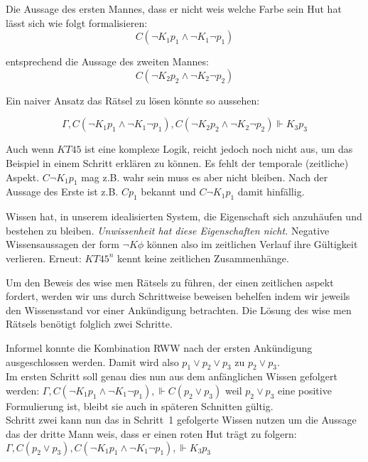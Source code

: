 Die Aussage des ersten Mannes, dass er nicht weis welche Farbe sein Hut hat lässt sich wie folgt formalisieren:
\begin{equation*}
	C(\neg K_1 p_1 \wedge \neg K_1 \neg p_1)
\end{equation*}

entsprechend die Aussage des zweiten Mannes:
\begin{equation*}
	C(\neg K_2 p_2 \wedge \neg K_2 \neg p_2)
\end{equation*}

Ein naiver Ansatz das Rätsel zu lösen könnte so aussehen:

\begin{equation}
	\Gamma, C(\neg K_1 p_1 \wedge \neg K_1 \neg p_1), C(\neg K_2 p_2 \wedge \neg K_2 \neg p_2) \Vdash K_3 p_3
\end{equation}

Auch wenn $KT45$ ist eine komplexe Logik, reicht jedoch noch nicht aus, um das Beispiel in einem Schritt erklären zu können.
Es fehlt der temporale (zeitliche) Aspekt.
$C \neg K_1 p_1$ mag z.B. wahr sein muss es aber nicht bleiben.
Nach der Aussage des Erste ist z.B. $C p_1$ bekannt und $C \neg K_1 p_1$ damit hinfällig.

Wissen hat, in unserem idealisierten System, die Eigenschaft sich anzuhäufen und bestehen zu bleiben. 
\emph{Unwissenheit hat diese Eigenschaften nicht.}
Negative Wissensaussagen der form $\neg K \phi$ können also im zeitlichen Verlauf ihre Gültigkeit verlieren.
Erneut: $KT45^n$ kennt keine zeitlichen Zusammenhänge.

Um den Beweis des wise men Rätsels zu führen, der einen zeitlichen aspekt fordert, werden wir uns durch Schrittweise beweisen behelfen indem wir jeweils den Wissensstand vor einer Ankündigung betrachten.
Die Lösung des wise men Rätsels benötigt folglich zwei Schritte.

Informel konnte die Kombination RWW nach der ersten Ankündigung ausgeschlossen werden.
Damit wird also $p_1 \vee p_2 \vee p_3$ zu $p_2 \vee p_3$.\\
Im ersten Schritt soll genau dies nun aus dem anfänglichen Wissen gefolgert werden:
$\Gamma, C(\neg K_1 p_1 \wedge \neg K_1 \neg p_1), \Vdash C(p_2 \vee p_3)$
weil $p_2 \vee p_3$ eine positive Formulierung ist, bleibt sie auch in späteren Schnitten gültig.\\
Schritt zwei kann nun das in Schritt~1 gefolgerte Wissen nutzen um die Aussage das der dritte Mann weis, dass er einen roten Hut trägt zu folgern:
$\Gamma, C(p_2 \vee p_3), C(\neg K_1 p_1 \wedge \neg K_1 \neg p_1), \Vdash K_3 p_3$

